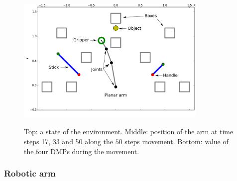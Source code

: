 \documentclass[10pt,letterpaper]{article}
\begin{document}
		\begin{figure}[h]
			\centering
			\hspace{-0.73cm}
			\vspace{-0.71cm}
			\includegraphics[width=9.12cm]{./include/tools.pdf}
			\\
			\hspace{-0.42cm}
			\caption{Top: a state of the environment. Middle: position of the arm at time steps 17, 33 and 50 along the $50$ steps movement. Bottom: value of the four DMPs during the movement.}
			\label{env}
		\end{figure}

		\subsubsection{Robotic arm}
		
\end{document}
